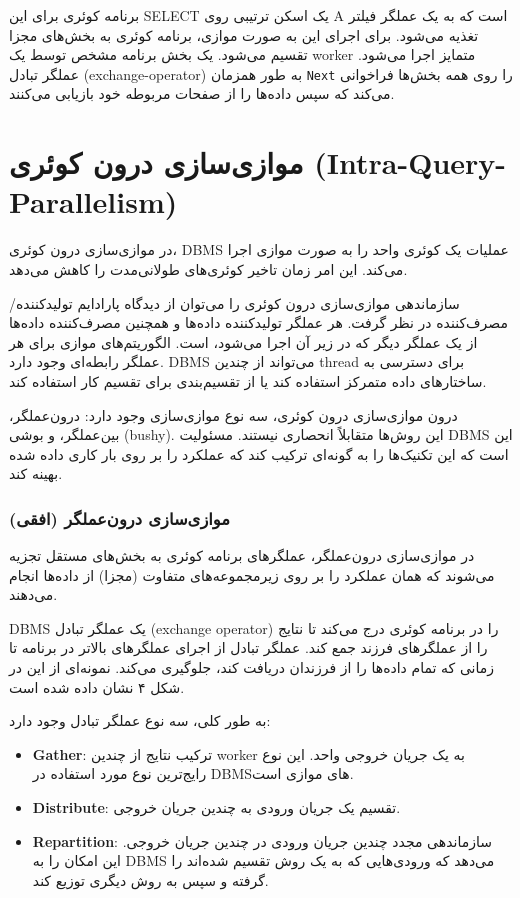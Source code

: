 برنامه کوئری برای این SELECT یک اسکن ترتیبی روی A است که به یک عملگر فیلتر تغذیه می‌شود. برای اجرای این به صورت موازی، برنامه کوئری به بخش‌های مجزا تقسیم می‌شود. یک بخش برنامه مشخص توسط یک worker متمایز اجرا می‌شود. عملگر تبادل (exchange-operator) به طور همزمان \texttt{Next} را روی همه بخش‌ها فراخوانی می‌کند که سپس داده‌ها را از صفحات مربوطه خود بازیابی می‌کنند.

\section{موازی‌سازی درون کوئری (Intra-Query-Parallelism)}
در موازی‌سازی درون کوئری، DBMS عملیات یک کوئری واحد را به صورت موازی اجرا می‌کند. این امر زمان تاخیر کوئری‌های طولانی‌مدت را کاهش می‌دهد.

سازماندهی موازی‌سازی درون کوئری را می‌توان از دیدگاه پارادایم تولیدکننده/مصرف‌کننده در نظر گرفت. هر عملگر تولیدکننده داده‌ها و همچنین مصرف‌کننده داده‌ها از یک عملگر دیگر که در زیر آن اجرا می‌شود، است. الگوریتم‌های موازی برای هر عملگر رابطه‌ای وجود دارد. DBMS می‌تواند از چندین thread برای دسترسی به ساختارهای داده متمرکز استفاده کند یا از تقسیم‌بندی برای تقسیم کار استفاده کند.

درون موازی‌سازی درون کوئری، سه نوع موازی‌سازی وجود دارد: درون‌عملگر، بین‌عملگر، و بوشی (bushy). این روش‌ها متقابلاً انحصاری نیستند. مسئولیت DBMS این است که این تکنیک‌ها را به گونه‌ای ترکیب کند که عملکرد را بر روی بار کاری داده شده بهینه کند.

\subsubsection{موازی‌سازی درون‌عملگر (افقی)}
در موازی‌سازی درون‌عملگر، عملگرهای برنامه کوئری به بخش‌های مستقل تجزیه می‌شوند که همان عملکرد را بر روی زیرمجموعه‌های متفاوت (مجزا) از داده‌ها انجام می‌دهند.

DBMS یک عملگر تبادل (exchange operator) را در برنامه کوئری درج می‌کند تا نتایج را از عملگرهای فرزند جمع کند. عملگر تبادل از اجرای عملگرهای بالاتر در برنامه تا زمانی که تمام داده‌ها را از فرزندان دریافت کند، جلوگیری می‌کند. نمونه‌ای از این در شکل ۴ نشان داده شده است.
\pagebreak

به طور کلی، سه نوع عملگر تبادل وجود دارد:
\begin{itemize}
	\item \textbf{Gather}: ترکیب نتایج از چندین worker به یک جریان خروجی واحد. این نوع رایج‌ترین نوع مورد استفاده در DBMSهای موازی است.
	\item \textbf{Distribute}: تقسیم یک جریان ورودی به چندین جریان خروجی.
	\item \textbf{Repartition}: سازماندهی مجدد چندین جریان ورودی در چندین جریان خروجی. این امکان را به DBMS می‌دهد که ورودی‌هایی که به یک روش تقسیم شده‌اند را گرفته و سپس به روش دیگری توزیع کند.
\end{itemize}


